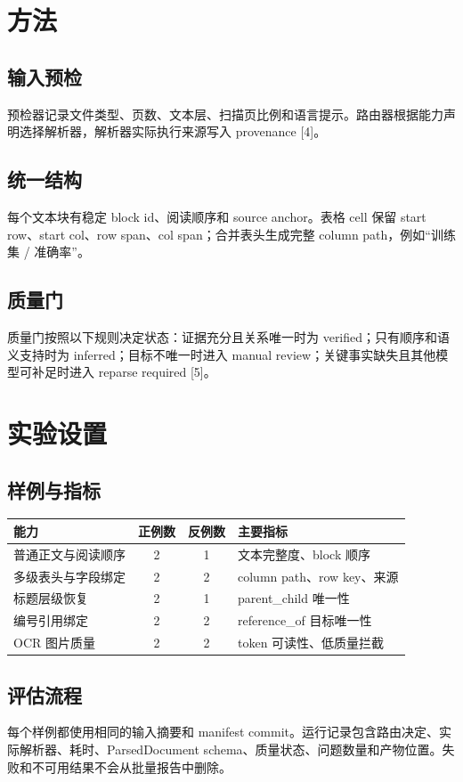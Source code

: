 \documentclass[10.5pt,a4paper]{article}
\begin{document}
\section{方法}
\subsection{输入预检}
预检器记录文件类型、页数、文本层、扫描页比例和语言提示。路由器根据能力声明选择解析器，解析器实际执行来源写入 provenance [4]。
\subsection{统一结构}
每个文本块有稳定 block id、阅读顺序和 source anchor。表格 cell 保留 start row、start col、row span、col span；合并表头生成完整 column path，例如“训练集 / 准确率”。
\subsection{质量门}
质量门按照以下规则决定状态：证据充分且关系唯一时为 verified；只有顺序和语义支持时为 inferred；目标不唯一时进入 manual review；关键事实缺失且其他模型可补足时进入 reparse required [5]。
\newpage
\section{实验设置}
\subsection{样例与指标}
\begin{tabular}{p{45mm}c c p{62mm}}
\toprule
能力 & 正例数 & 反例数 & 主要指标\\\midrule
普通正文与阅读顺序 & 2 & 1 & 文本完整度、block 顺序\\
多级表头与字段绑定 & 2 & 2 & column path、row key、来源\\
标题层级恢复 & 2 & 1 & parent\_child 唯一性\\
编号引用绑定 & 2 & 2 & reference\_of 目标唯一性\\
OCR 图片质量 & 2 & 2 & token 可读性、低质量拦截\\
\bottomrule
\end{tabular}
\subsection{评估流程}
每个样例都使用相同的输入摘要和 manifest commit。运行记录包含路由决定、实际解析器、耗时、ParsedDocument schema、质量状态、问题数量和产物位置。失败和不可用结果不会从批量报告中删除。
\end{document}
